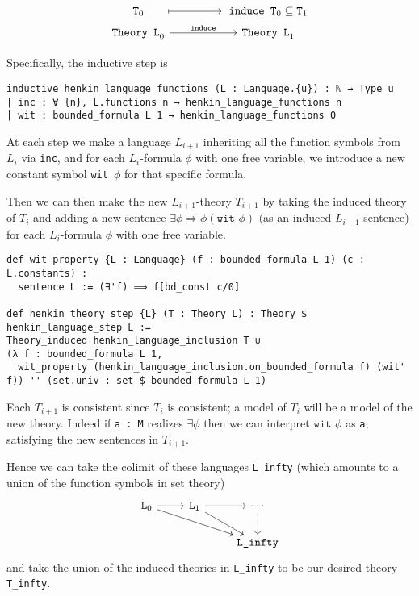 \documentclass{article}
\renewcommand{\implies}{\Rightarrow}
\newcommand{\subs}{\subseteq}
\newcommand{\<}{\langle}
\renewcommand{\>}{\rangle}
\theoremstyle{definitionstyle}
\theoremstyle{exercisestyle}
\theoremstyle{remarkstyle}
\begin{document}
\[\begin{tikzcd}[row sep = tiny]
	{\texttt{T}_0} && {\texttt{induce T}_0 \subs \texttt{T}_1} \\
	{\texttt{Theory L}_0} && {\texttt{Theory L}_1}
	\arrow["{\texttt{induce}}", from=2-1, to=2-3]
	\arrow[shorten <=17pt, shorten >=2pt, maps to, from=1-1, to=1-3]
\end{tikzcd}\]

Specifically, the inductive step is
\begin{lstlisting}
inductive henkin_language_functions (L : Language.{u}) : ℕ → Type u
| inc : ∀ {n}, L.functions n → henkin_language_functions n
| wit : bounded_formula L 1 → henkin_language_functions 0 \end{lstlisting}
At each step we make a language $L_{i+1}$
inheriting all the function symbols from $L_{i}$ via \texttt{inc},
and for each $L_{i}$-formula $\phi$ with one free variable, we introduce a
new constant symbol \texttt{wit $\phi$} for that specific formula.

Then we can then make the new $L_{i+1}$-theory $T_{i+1}$ by taking the induced theory of
$T_{i}$ and adding a new sentence $\exists \phi \implies \phi(\texttt{wit } \phi)$
(as an induced $L_{i+1}$-sentence) for each $L_{i}$-formula $\phi$ with one free variable.

\begin{lstlisting}
def wit_property {L : Language} (f : bounded_formula L 1) (c : L.constants) :
  sentence L := (∃'f) ⟹ f[bd_const c/0]

def henkin_theory_step {L} (T : Theory L) : Theory $ henkin_language_step L :=
Theory_induced henkin_language_inclusion T ∪
(λ f : bounded_formula L 1,
  wit_property (henkin_language_inclusion.on_bounded_formula f) (wit' f)) '' (set.univ : set $ bounded_formula L 1)
\end{lstlisting}

Each $T_{i+1}$ is consistent since $T_{i}$ is consistent;
a model of $T_{i}$ will be a model of the new theory.
Indeed if \texttt{a : M} realizes $\exists \phi$
then we can interpret $\texttt{wit } \phi$ as \texttt{a},
satisfying the new sentences in $T_{i+1}$.

Hence we can take the colimit of these languages \texttt{L\_infty}
(which amounts to a union of the function symbols in set theory)
\[\begin{tikzcd}
	{\texttt{L}_0} & {\texttt{L}_1} & \cdots \\
	&& {\texttt{L\_infty}}
	\arrow[from=1-1, to=1-2]
	\arrow[from=1-2, to=1-3]
	\arrow[from=1-1, to=2-3]
	\arrow[from=1-2, to=2-3]
	\arrow[dotted, from=1-3, to=2-3]
\end{tikzcd}\]
and take the union of the induced theories in \texttt{L\_infty}
to be our desired theory \texttt{T\_infty}.
\end{document}
